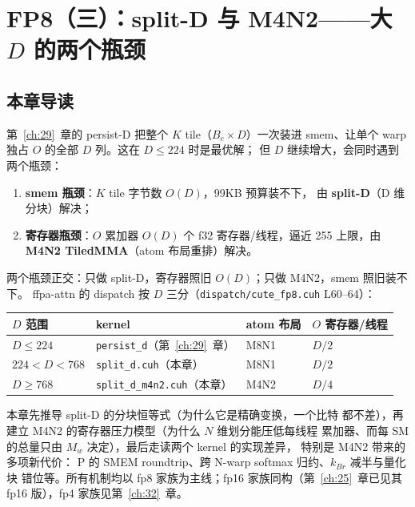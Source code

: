 \chapter{FP8（三）：split-D 与 M4N2——大 $D$ 的两个瓶颈}\label{ch:30}

\section{本章导读}

第~\ref{ch:29}~章的 persist-D 把整个 $K$ tile（$B_c\times D$）一次装进
smem、让单个 warp 独占 $O$ 的全部 $D$ 列。这在 $D\le 224$ 时是最优解；
但 $D$ 继续增大，会同时遇到两个瓶颈：

\begin{enumerate}[itemsep=0pt,topsep=2pt]
  \item \textbf{smem 瓶颈}：$K$ tile 字节数 $O(D)$，99KB 预算装不下，
        由 \textbf{split-D}（D 维分块）解决；
  \item \textbf{寄存器瓶颈}：$O$ 累加器 $O(D)$ 个 f32 寄存器/线程，逼近
        255 上限，由 \textbf{M4N2 TiledMMA}（atom 布局重排）解决。
\end{enumerate}

两个瓶颈正交：只做 split-D，寄存器照旧 $O(D)$；只做 M4N2，smem 照旧装不下。
ffpa-attn 的 dispatch 按 $D$ 三分（\texttt{dispatch/\allowbreak{}cute\_fp8.cuh}
L60--64）：

\begin{center}
\begin{tabular}{@{}llll@{}}
\toprule
$D$ 范围 & kernel & atom 布局 & $O$ 寄存器/线程 \\
\midrule
$D\le 224$ & \texttt{persist\_d}（第~\ref{ch:29}~章） & M8N1 & $D/2$ \\
$224<D<768$ & \texttt{split\_d.cuh}（本章） & M8N1 & $D/2$ \\
$D\ge 768$ & \texttt{split\_d\_m4n2.cuh}（本章） & M4N2 & $D/4$ \\
\bottomrule
\end{tabular}
\end{center}

本章先推导 split-D 的分块恒等式（为什么它是精确变换，一个比特
都不差），再建立 M4N2 的寄存器压力模型（为什么 $N$ 维划分能压低每线程
累加器、而每 SM 的总量只由 $M_w$ 决定），最后走读两个 kernel 的实现差异，
特别是 M4N2 带来的多项新代价：
P 的 SMEM roundtrip、跨 N-warp softmax 归约、$k_{Br}$ 减半与量化块
错位等。所有机制均以
fp8 家族为主线；fp16 家族同构（第~\ref{ch:25}~章已见其 fp16 版），fp4
家族见第~\ref{ch:32}~章。

